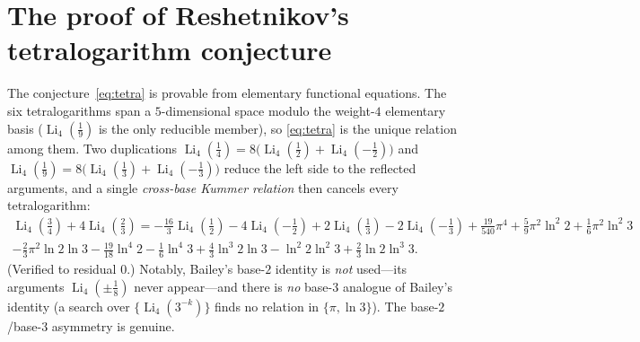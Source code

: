\documentclass[11pt]{article}
\DeclareMathOperator{\Li}{Li}
\theoremstyle{plain}\newtheorem{theorem}{Theorem}\newtheorem{proposition}[theorem]{Proposition}
\theoremstyle{remark}\newtheorem{remark}[theorem]{Remark}
\begin{document}
\section{The proof of Reshetnikov's tetralogarithm conjecture}
The conjecture~\eqref{eq:tetra} is provable from elementary functional equations. The six tetralogarithms span a
$5$-dimensional space modulo the weight-$4$ elementary basis ($\Li_4(\tfrac19)$ is the only reducible member), so
\eqref{eq:tetra} is the unique relation among them. Two duplications
$\Li_4(\tfrac14)=8\bigl(\Li_4(\tfrac12)+\Li_4(-\tfrac12)\bigr)$ and
$\Li_4(\tfrac19)=8\bigl(\Li_4(\tfrac13)+\Li_4(-\tfrac13)\bigr)$ reduce the left side to the reflected arguments,
and a single \emph{cross-base Kummer relation} then cancels every tetralogarithm:
{\footnotesize
\begin{multline}\label{eq:kummer}
  \Li_4(\tfrac34)+4\Li_4(\tfrac23)=-\tfrac{16}3\Li_4(\tfrac12)-4\Li_4(-\tfrac12)+2\Li_4(\tfrac13)-2\Li_4(-\tfrac13)
  +\tfrac{19}{540}\pi^4+\tfrac59\pi^2\ln^2 2+\tfrac16\pi^2\ln^2 3\\
  -\tfrac23\pi^2\ln2\ln3-\tfrac{19}{18}\ln^4 2-\tfrac16\ln^4 3+\tfrac43\ln^3 2\ln3-\ln^2 2\ln^2 3+\tfrac23\ln2\ln^3 3.
\end{multline}}
\!(Verified to residual $0$.) Notably, Bailey's base-$2$ identity is \emph{not} used---its arguments $\Li_4(\pm\tfrac18)$
never appear---and there is \emph{no} base-$3$ analogue of Bailey's identity (a search over $\{\Li_4(3^{-k})\}$ finds
no relation in $\{\pi,\ln3\}$). The base-$2$/base-$3$ asymmetry is genuine.
\end{document}
